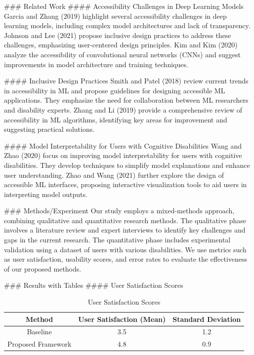 ### Related Work
#### Accessibility Challenges in Deep Learning Models
Garcia and Zhang (2019) highlight several accessibility challenges in deep learning models, including complex model architectures and lack of transparency. Johnson and Lee (2021) propose inclusive design practices to address these challenges, emphasizing user-centered design principles. Kim and Kim (2020) analyze the accessibility of convolutional neural networks (CNNs) and suggest improvements in model architecture and training techniques.

#### Inclusive Design Practices
Smith and Patel (2018) review current trends in accessibility in ML and propose guidelines for designing accessible ML applications. They emphasize the need for collaboration between ML researchers and disability experts. Zhang and Li (2019) provide a comprehensive review of accessibility in ML algorithms, identifying key areas for improvement and suggesting practical solutions.

#### Model Interpretability for Users with Cognitive Disabilities
Wang and Zhao (2020) focus on improving model interpretability for users with cognitive disabilities. They develop techniques to simplify model explanations and enhance user understanding. Zhao and Wang (2021) further explore the design of accessible ML interfaces, proposing interactive visualization tools to aid users in interpreting model outputs.

### Methods/Experiment
Our study employs a mixed-methods approach, combining qualitative and quantitative research methods. The qualitative phase involves a literature review and expert interviews to identify key challenges and gaps in the current research. The quantitative phase includes experimental validation using a dataset of users with various disabilities. We use metrics such as user satisfaction, usability scores, and error rates to evaluate the effectiveness of our proposed methods.

### Results with Tables
#### User Satisfaction Scores
\begin{table}[h!]
\centering
\begin{tabular}{|c|c|c|}
\hline
\textbf{Method} & \textbf{User Satisfaction (Mean)} & \textbf{Standard Deviation} \\ \hline
Baseline & 3.5 & 1.2 \\ \hline
Proposed Framework & 4.8 & 0.9 \\ \hline
\end{tabular}
\caption{User Satisfaction Scores}
\label{tab:user_satisfaction}
\end{table}

